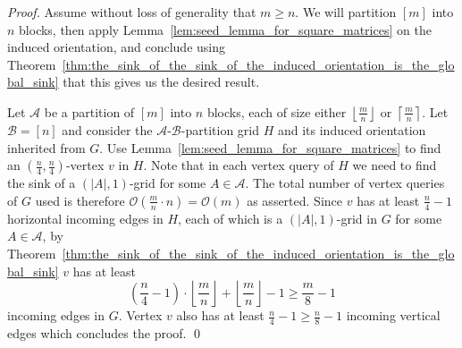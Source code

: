 \documentclass[runningheads,a4paper]{llncs}
\newcommand{\A}{\ensuremath{\mathcal A}}
\newcommand{\B}{\ensuremath{\mathcal B}}
\begin{document}
\begin{proof}
 Assume without loss of generality that $m \geq n$. 
 We will partition $[m]$ into $n$ blocks, then apply Lemma~\ref{lem:seed_lemma_for_square_matrices} on the induced orientation, and conclude using Theorem~\ref{thm:the_sink_of_the_sink_of_the_induced_orientation_is_the_global_sink} that this  gives us the desired result.
 
  Let $\A$ be a partition of $[m]$ into $n$ blocks, each of size either $\left\lfloor \frac{m}{n} \right\rfloor$ or $\left\lceil \frac{m}{n} \right\rceil$. Let $\B = [n]$ and 
consider the $\A$-$\B$-partition grid $H$ and its induced orientation inherited from $G$. 
 Use Lemma~\ref{lem:seed_lemma_for_square_matrices} to find an $(\frac{n}{4}, \frac{n}{4})$-vertex $v$ in $H$. 
 Note that in each vertex query of $H$ we need to find the sink of a $(|A|,1)$-grid for some $A\in \A$. 
 The total number of vertex queries of $G$ used is therefore $\mathcal{O}(\frac{m}{n}\cdot n) = \mathcal{O}(m)$ as asserted. 
 Since $v$ has at least $\frac{n}{4} - 1$ horizontal incoming edges in $H$, each of which is a $(|A|,1)$-grid in $G$ for some $A\in \A$, 
 by Theorem~\ref{thm:the_sink_of_the_sink_of_the_induced_orientation_is_the_global_sink} $v$ has at least $$\left(\frac{n}{4} - 1\right)\cdot\left\lfloor \frac{m}{n} \right\rfloor + \left\lfloor \frac{m}{n} \right\rfloor - 1 \geq \frac{m}{8} - 1$$ incoming edges in $G$.
 Vertex $v$ also has at least $\frac{n}{4} - 1 \geq \frac{n}{8} - 1$ incoming vertical edges which concludes the proof. \qed
\end{proof}


\end{document}

